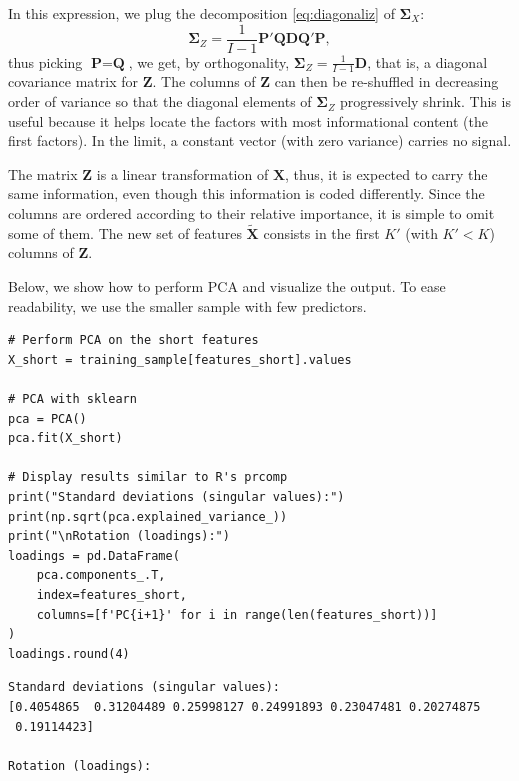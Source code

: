 In this expression, we plug the decomposition \ref{eq:diagonaliz} of $\boldsymbol{\Sigma}_X$:
\begin{equation}
\boldsymbol{\Sigma}_Z=\frac{1}{I-1}\textbf{P}'\textbf{Q}\textbf{DQ}'\textbf{P},
\end{equation}
thus picking $\textbf{P}=\textbf{Q}$, we get, by orthogonality, $\boldsymbol{\Sigma}_Z=\frac{1}{I -1}\textbf{D}$, that is, a diagonal covariance matrix for $\textbf{Z}$. The columns of $\textbf{Z}$ can then be re-shuffled in decreasing order of variance so that the diagonal elements of $\boldsymbol{\Sigma}_Z$ progressively shrink. This is useful because it helps locate the factors with most informational content (the first factors). In the limit, a constant vector (with zero variance) carries no signal.

The matrix $\textbf{Z}$ is a linear transformation of $\textbf{X}$, thus, it is expected to carry the same information, even though this information is coded differently. Since the columns are ordered according to their relative importance, it is simple to omit some of them. The new set of features $\tilde{\textbf{X}}$ consists in the first $K'$ (with $K'<K$) columns of $\textbf{Z}$.

Below, we show how to perform PCA and visualize the output. To ease readability, we use the smaller sample with few predictors.

\begin{verbatim}
# Perform PCA on the short features
X_short = training_sample[features_short].values

# PCA with sklearn
pca = PCA()
pca.fit(X_short)

# Display results similar to R's prcomp
print("Standard deviations (singular values):")
print(np.sqrt(pca.explained_variance_))
print("\nRotation (loadings):")
loadings = pd.DataFrame(
    pca.components_.T,
    index=features_short,
    columns=[f'PC{i+1}' for i in range(len(features_short))]
)
loadings.round(4)
\end{verbatim}

\begin{verbatim}
Standard deviations (singular values):
[0.4054865  0.31204489 0.25998127 0.24991893 0.23047481 0.20274875
 0.19114423]

Rotation (loadings):
\end{verbatim}

